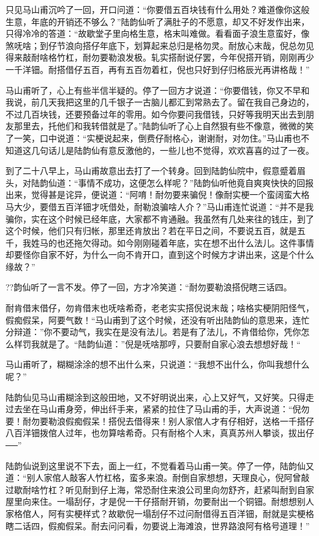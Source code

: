 \documentclass[12pt,UTF8]{ctexbook}
\begin{document}
{{{只见马山甫沉吟了一回，开口问道：“你要借五百块钱有什么用处？难道像你这般生意，年底的开销还不够么？”陆韵仙听了满肚子的不愿意，却又不好发作出来，只得冷冷的答道：“故歇堂子里向格生意，格末叫难做。看看面子浪生意蛮好，像煞呒啥；到仔节浪向搭仔年底下，划算起来总归是格勿灵。耐放心末哉，倪总勿见得来敲耐啥格竹杠，耐勿要勒浪发极。轧实搭耐说仔罢，今年倪搭开销，刚刚再少一千洋钿。耐搭借仔五百，再有五百勿着杠，倪也只好到仔归格辰光再讲格哉！”

马山甫听了，心上有些半信半疑的。停了一回方才说道：“你要借钱，你又不早和我说，前几天我把这里的几千银子一古脑儿都汇到常熟去了。留在我自己身边的，不过几百块钱，还要预备过年的零用。如今你要问我借钱，只好等我明天出去到朋友那里去，托他们和我转借就是了。”陆韵仙听了心上自然狠有些不像意，微微的笑了一笑，口中说道：“实梗说起来，倒费仔耐格心，谢谢耐，对勿住。”马山甫也不知道这几句话儿是陆韵仙有意反激他的，一些儿也不觉得，欢欢喜喜的过了一夜。

到了二十八早上，马山甫故意出去打了一个转身。回到陆韵仙院中，假意蹙着眉头，对陆韵仙道：“事情不成功，这便怎么样呢？”陆韵仙听他竟自爽爽快快的回报出来，觉得甚是诧异，便说道：“阿唷！耐勿要来骗倪！像耐实梗一个蛮阔蛮大格马大少，要借五百洋钿才呒借处，耐勒浪骗啥人介？”马山甫连忙说道：“并不是我骗你，实在这个时候已经年底，大家都不肯通融。我虽然有几处来往的钱庄，到了这个时候，他们只有归帐，那里还肯放出？若在平日之间，不要说五百，就是五千，我姓马的也还拖欠得动。如今刚刚碰着年底，实在想不出什么法儿。这件事情却要怪你自家不好，为什么一向不肯开口，直到这个时候方才讲出来，这是个什么缘故？”

??韵仙听了一言不发。停了一回，方才冷笑道：“耐勿要勒浪搭倪瞎三话四。

耐肯借末借仔，勿肯借末也呒啥希奇，老老实实搭倪说末哉；啥格实梗阴阳怪气，假痴假呆，阿要气数！“马山甫到了这个时候，还没有听出陆韵仙的意思来，连忙分辩道：”你不要动气，我实在是没有法儿。若是有了法儿，不肯借给你，凭你怎么样罚我就是了。“陆韵仙道：”倪是呒啥那哼，只要耐自家心浪去想想好哉！“

马山甫听了，糊糊涂涂的想不出什么来，只说道：“我想不出什么，你叫我想什么呢？”

陆韵仙见马山甫糊涂到这般田地，又不好明说出来，心上又好气，又好笑。只得走过去坐在马山甫身旁，伸出纤手来，紧紧的拉住了马山甫的手，大声说道：“倪勿要！耐勿要勒浪假痴假呆！搭倪去借得来！别人家倌人才有仔相好，送格一千搭仔八百洋钿拨倌人过年，也勿算啥希奇。只有耐格个人末，真真苏州人攀谈，拔出仔──”

陆韵仙说到这里说不下去，面上一红，不觉看着马山甫一笑。停了一停，陆韵仙又道：“别人家倌人敲客人竹杠格，蛮多来浪。耐倒自家想想，天理良心，倪阿曾敲过歇耐啥竹杠？听见耐到仔上海，常恐耐住来浪公司里向勿舒齐，赶紧叫耐到自家屋里向来住。一塌刮仔，才是倪一干仔搭耐开销，勿要耐出一个铜钿。耐想想别人家格倌人，阿有实梗样式？故歇倪一塌刮仔不过问耐借得五百洋钿，耐就是实梗格瞎二话四，假痴假呆。耐去问问看，勿要说上海滩浪，世界路浪阿有格号道理！”

}}}
\end{document}
